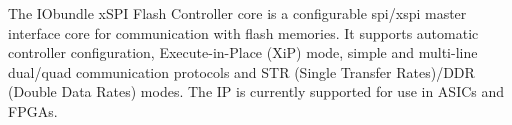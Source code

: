 The IObundle xSPI Flash Controller core is a configurable spi/xspi master interface core
for communication with flash memories. It supports automatic controller configuration,
Execute-in-Place (XiP) mode, simple and multi-line dual/quad communication protocols
and STR (Single Transfer Rates)/DDR (Double Data Rates) modes. 
The IP is currently supported for use in ASICs and FPGAs.
